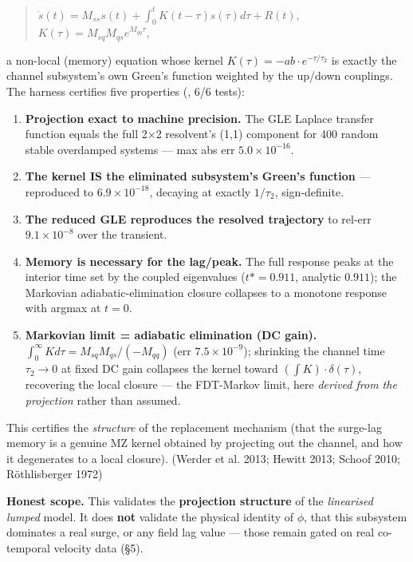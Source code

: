 \documentclass[11pt]{article}
\begin{document}
\begin{quote}
$\dot{s}(t) = M_{ss} s(t) + \int _{0}^{t} K(t-\tau ) s(\tau ) d\tau  + R(t)$, $K(\tau ) = M_{sq} M_{qs} e^{M_{qq} \tau }$,
\end{quote}


a non-local (memory) equation whose kernel $K(\tau )=-ab\cdot e^{-\tau /\tau _{2}}$ is exactly the channel subsystem's own Green's function weighted by the up/down couplings. The harness certifies five properties (, 6/6 tests):


\begin{enumerate}
\item \textbf{Projection exact to machine precision.} The GLE Laplace transfer function equals the full 2\ensuremath{\times}2 resolvent's (1,1) component for 400 random stable overdamped systems — max abs err \textbf{$5.0\times 10^{-16}$}.
\item \textbf{The kernel IS the eliminated subsystem's Green's function} — reproduced to \textbf{$6.9\times 10^{-18}$}, decaying at exactly $1/\tau _{2}$, sign-definite.
\item \textbf{The reduced GLE reproduces the resolved trajectory} to rel-err \textbf{$9.1\times 10^{-8}$} over the transient.
\item \textbf{Memory is necessary for the lag/peak.} The full response peaks at the interior time set by the coupled eigenvalues ($t*=0.911$, analytic $0.911$); the Markovian adiabatic-elimination closure collapses to a monotone response with argmax at $t=0$.
\item \textbf{Markovian limit = adiabatic elimination (DC gain).} $\int _{0}^\infty  K d\tau  = M_{sq} M_{qs}/(-M_{qq})$ (err $7.5\times 10^{-9}$); shrinking the channel time $\tau _{2}\to 0$ at fixed DC gain collapses the kernel toward $(\int K)\cdot \delta (\tau )$, recovering the local closure — the FDT-Markov limit, here \emph{derived from the projection} rather than assumed.
\end{enumerate}


This certifies the \emph{structure} of the replacement mechanism (that the surge-lag memory is a genuine MZ kernel obtained by projecting out the channel, and how it degenerates to a local closure). (Werder et al. 2013; Hewitt 2013; Schoof 2010; Röthlisberger 1972)


\textbf{Honest scope.} This validates the \textbf{projection structure} of the \emph{linearised lumped} model. It does \textbf{not} validate the physical identity of $\phi $, that this subsystem dominates a real surge, or any field lag value — those remain gated on real co-temporal velocity data (§5).
\end{document}
